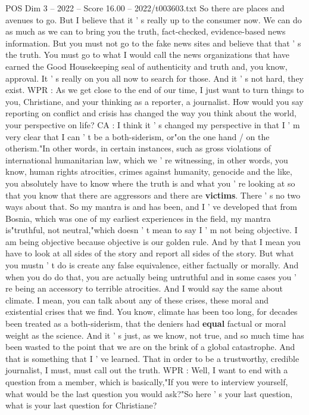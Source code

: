\begin{textsample}{POS Dim 3 – 2022 – Score 16.00 – 2022/t003603.txt}
So there are places and avenues to go.
But I believe that it ' s really up to the consumer now.
We can do as much as we can to bring you the truth, fact-checked, evidence-based news information.
But you must not go to the fake news sites and believe that that ' s the truth.
You must go to what I would call the news organizations that have earned the Good Housekeeping seal of authenticity and truth and, you know, approval.
It ' s really on you all now to search for those.
And it ' s not hard, they exist.
WPR : As we get close to the end of our time, I just want to turn things to you, Christiane, and your thinking as a reporter, a journalist.
How would you say reporting on conflict and crisis has changed the way you think about the world, your perspective on life?
CA : I think it ' s changed my perspective in that I ' m very clear that I can ' t be a both-siderism, or"on the one hand / on the otherism."In other words, in certain instances, such as gross violations of international humanitarian law, which we ' re witnessing, in other words, you know, human rights atrocities, crimes against humanity, genocide and the like, you absolutely have to know where the truth is and what you ' re looking at so that you know that there are aggressors and there are \textbf{victims}.
There ' s no two ways about that.
So my mantra is and has been, and I ' ve developed that from Bosnia, which was one of my earliest experiences in the field, my mantra is"truthful, not neutral,"which doesn ' t mean to say I ' m not being objective.
I am being objective because objective is our golden rule.
And by that I mean you have to look at all sides of the story and report all sides of the story.
But what you mustn ' t do is create any false equivalence, either factually or morally.
And when you do do that, you are actually being untruthful and in some cases you ' re being an accessory to terrible atrocities.
And I would say the same about climate.
I mean, you can talk about any of these crises, these moral and existential crises that we find.
You know, climate has been too long, for decades been treated as a both-siderism, that the deniers had \textbf{equal} factual or moral weight as the science.
And it ' s just, as we know, not true, and so much time has been wasted to the point that we are on the brink of a global catastrophe.
And that is something that I ' ve learned.
That in order to be a trustworthy, credible journalist, I must, must call out the truth.
WPR : Well, I want to end with a question from a member, which is basically,"If you were to interview yourself, what would be the last question you would ask?"So here ' s your last question, what is your last question for Christiane?

\end{textsample}
